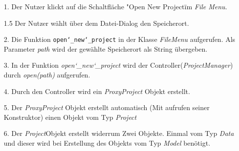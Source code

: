 \documentclass{article}
\begin{document}
\begin{enumerate}
    \item[1.] Der Nutzer klickt auf die Schaltfläche "Open New Project\" im \textit{File Menu}.
    \item[1.5] Der Nutzer wählt über dem Datei-Dialog den Speicherort.  
    \item[2.] Die Funktion \texttt{open\char`_new\char`_project} in der Klasse \textit{FileMenu} aufgerufen. Als Parameter \textit{path} wird der gewählte Speicherort als String übergeben.
    \item[3.] In der Funktion \textit{open\char`_new\char`_project} wird der Controller(\textit{ProjectManager}) durch \textit{open(path)} aufgerufen.
    \item[4.] Durch den Controller wird ein \textit{ProxyProject} Objekt erstellt.
    \item[5.] Der \textit{ProxyProject} Objekt erstellt automatisch (Mit aufrufen seiner Konstruktor) einen Objekt vom Typ \textit{Project}
    \item[6.] Der \textit{Project}\textendash Objekt erstellt widerrum Zwei Objekte. Einmal vom Typ \textit{Data} und dieser wird bei Erstellung des Objekts vom Typ \textit{Model} benötigt. 
\end{enumerate}
\end{document}
